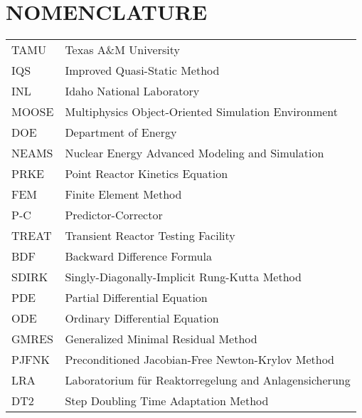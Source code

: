 %
%
%
%


\chapter*{NOMENCLATURE}

\vspace{-0.5in}
	\begin{table}[htbp]
	    \begin{tabular}{@{}p{} p{}@{}}
		TAMU	&	Texas A\&M University\\	 
		IQS 	& 	Improved Quasi-Static Method\\
		INL 	& 	Idaho National Laboratory\\  
		MOOSE 	& 	Multiphysics Object-Oriented Simulation Environment\\  
		DOE 	& 	Department of Energy\\  
		NEAMS 	& 	Nuclear Energy Advanced Modeling and Simulation\\  
		PRKE 	& 	Point Reactor Kinetics Equation\\  
		FEM 	& 	Finite Element Method\\  
		P-C 	& 	Predictor-Corrector\\  
		TREAT 	& 	Transient Reactor Testing Facility\\  
		BDF 	& 	Backward Difference Formula\\  
		SDIRK 	& 	Singly-Diagonally-Implicit Rung-Kutta Method\\  
		PDE 	& 	Partial Differential Equation\\  
		ODE 	& 	Ordinary Differential Equation\\  
		GMRES 	& 	Generalized Minimal Residual Method\\  
		PJFNK 	& 	Preconditioned Jacobian-Free Newton-Krylov Method\\  
		LRA 	& 	Laboratorium f\"{u}r Reaktorregelung and Anlagensicherung\\  
		DT2 	& 	Step Doubling Time Adaptation Method\\  
	    \end{tabular}%
	\end{table}

\pagebreak{}